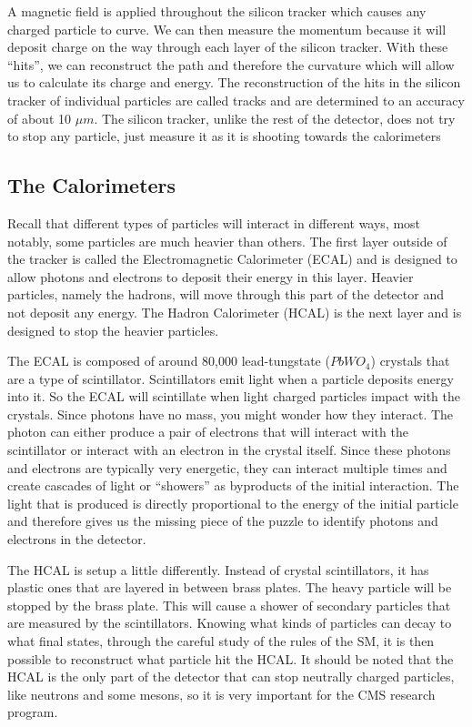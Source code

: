 A magnetic field is applied throughout the silicon tracker which causes any charged particle to curve.
We can then measure the momentum because it will deposit charge on the way through each layer of the silicon tracker. 
With these ``hits'', we can reconstruct the path and therefore the curvature which will allow us to calculate its charge and energy.
The reconstruction of the hits in the silicon tracker of individual particles are called tracks and are determined to an accuracy of about 10 $\mu m$.
The silicon tracker, unlike the rest of the detector, does not try to stop any particle, just measure it as it is shooting towards the calorimeters

\subsection{The Calorimeters}

Recall that different types of particles will interact in different ways, most notably, some particles are much heavier than others.
The first layer outside of the tracker is called the Electromagnetic Calorimeter (ECAL) and is designed to allow photons and electrons to deposit their energy in this layer. 
Heavier particles, namely the hadrons, will move through this part of the detector and not deposit any energy. The Hadron Calorimeter (HCAL) is the next layer and is designed to stop the heavier particles.

The ECAL is composed of around 80,000 lead-tungstate ($PbWO_4$) crystals that are a type of scintillator.
Scintillators emit light when a particle deposits energy into it. So the ECAL will scintillate when light charged particles impact with the crystals.
Since photons have no mass, you might wonder how they interact. The photon can either produce a pair of electrons that will interact with the scintillator or interact with an electron in the crystal itself.
Since these photons and electrons are typically very energetic, they can interact multiple times and create cascades of light or ``showers'' as byproducts of the initial interaction.
The light that is produced is directly proportional to the energy of the initial particle and therefore gives us the missing piece of the puzzle to identify photons and electrons in the detector.

The HCAL is setup a little differently. Instead of crystal scintillators, it has plastic ones that are layered in between brass plates.
The heavy particle will be stopped by the brass plate. This will cause a shower of secondary particles that are measured by the scintillators.
Knowing what kinds of particles can decay to what final states, through the careful study of the rules of the SM, it is then possible to reconstruct what particle hit the HCAL.
It should be noted that the HCAL is the only part of the detector that can stop neutrally charged particles, like neutrons and some mesons, so it is very important for the CMS research program.

